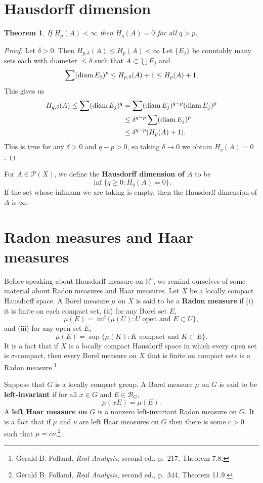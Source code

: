 \documentclass{article}
\newcommand{\diam}{\ensuremath\mathrm{diam}\,}
\newtheorem{theorem}{Theorem}
\theoremstyle{definition}
\begin{document}
\section{Hausdorff dimension}
\begin{theorem}
If $H_p(A)<\infty$ then $H_q(A)=0$ for all $q>p$.
\end{theorem}
\begin{proof}
Let $\delta>0$. Then
$H_{p,\delta}(A) \leq H_p(A)<\infty$
Let $\{E_j\}$ be countably many sets each with diameter $\leq \delta$ such that
$A \subset \bigcup E_j$ and
\[
\sum (\diam E_j)^p \leq H_{p,\delta}(A)+1 \leq H_p(A)+1.
\]
This gives us
\begin{align*}
H_{q.\delta}(A) \leq \sum (\diam E_j)^q &= \sum (\diam E_j)^{q-p} (\diam E_j)^p\\
&\leq \delta^{q-p} \sum (\diam E_j)^p\\
&\leq \delta^{q-p} (H_p(A)+1).
\end{align*}
This is true for any $\delta>0$ and $q-p>0$, so taking $\delta \to 0$ we obtain $H_q(A)=0$.
\end{proof}

For $A \in \mathscr{P}(X)$, we define the \textbf{Hausdorff dimension of $A$} to be 
\[
\inf\{q \geq 0: H_q(A) = 0\}.
\]
If the set whose infimum we are taking is empty, then the Hausdorff dimension of $A$ is $\infty$.



\section{Radon measures and Haar measures}
Before speaking about Hausdorff measure on $\mathbb{R}^n$, we remind ourselves of some material about Radon measures
and  Haar measures.
Let $X$ be a locally compact Hausdorff space. A Borel measure $\mu$ on $X$ is said to be a \textbf{Radon measure} if (i) it is finite
on each compact set, (ii) for any Borel set $E$,
\[
\mu(E) = \inf\{\mu(U): \textrm{$U$ open and $E \subset U$}\},
\]
and (iii) for any open set $E$,
\[
\mu(E) = \sup\{\mu(K): \textrm{$K$ compact and $K \subset E$}\}.
\]
It is a fact that if $X$ is a locally compact Hausdorff space in which every open set is $\sigma$-compact, then every Borel measure on $X$ that
is finite on compact sets
is a Radon measure.\footnote{Gerald B. Folland, {\em Real Analysis}, second ed., p.~217, Theorem 7.8.}

Suppose that $G$ is a locally compact group.
A Borel measure $\mu$ on $G$ is said to be \textbf{left-invariant} if for all $x \in G$ and $E \in \mathscr{B}_G$,
\[
\mu(xE)=\mu(E).
\]
A \textbf{left Haar measure on $G$} is a nonzero left-invariant Radon measure on $G$. 
It is a fact that if $\mu$ and $\nu$ are left Haar measures on $G$ then there is some $c>0$ such that 
$\mu=c\nu$.\footnote{Gerald B. Folland, {\em Real Analysis}, second ed., p.~344, Theorem 11.9.} 
\end{document}

